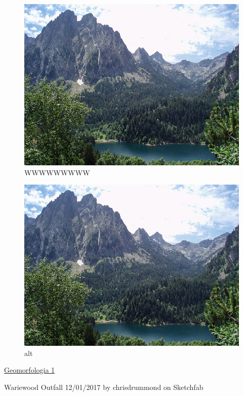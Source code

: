 \documentclass[16pt,]{krantz}
\theoremstyle{definition}
\theoremstyle{definition}
\theoremstyle{definition}
\theoremstyle{definition}
\theoremstyle{remark}
\begin{document}
\begin{figure}[!ht]

{\centering \includegraphics{geomorfo} 

}

\caption{WWWWWWWWW}\label{fig:wwUUU}
\end{figure}

\begin{figure}
\centering
\includegraphics{geomorfo.jpeg}
\caption{alt}
\end{figure}

\href{https://sketchfab.com/3d-models/eldgos-i-geldingadolum-a-reykjanesskaga-7bcb3d856e1947a4a78c1810f559b3ea}{Geomorfologia 1}

Wariewood Outfall 12/01/2017 by chrisdrummond on Sketchfab
\end{document}
